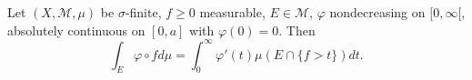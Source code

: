 Let $(X,\mathcal{M},\mu)$ be $\sigma$-finite, $f \geq 0$ measurable, $E \in \mathcal{M}$, $\varphi$ nondecreasing on $[0,\infty[$, absolutely continuous on $[0,a]$ with $\varphi(0)=0$. Then
$$\int_E \varphi \circ f d\mu = \int_0^\infty \varphi'(t) \mu(E \cap \{f > t\}) dt.$$
